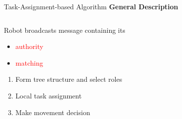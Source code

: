 \begin{frame}{Task-Assignment-based Algorithm}
  \textbf{General Description}
  \begin{columns}[T] %
   \begin{column}{.45\textwidth}
     Robot broadcasts message containing its
     \begin{itemize}
     \item \textcolor{red}{authority} 
     \item \textcolor{red}{matching}
     \end{itemize}

     \begin{enumerate}
     \item Form tree structure and select roles
     \item Local task assignment
     \item Make movement decision
     \end{enumerate}
    \end{column}%
    \begin{column}{.45\textwidth}
      
    \end{column}%
  \end{columns}
\end{frame}